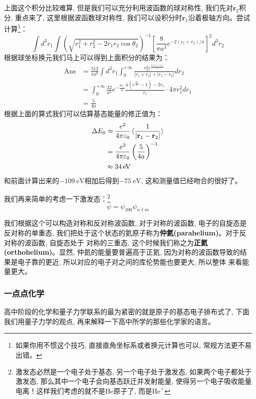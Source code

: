 上面这个积分比较难算, 但是我们可以充分利用波函数的球对称性, 我们先对$\mathbf{r}_2$积分, 重点来了, 这里根据波函数球对称性, 我们可以设积分时$\mathbf{r}_1$沿着极轴方向。尝试计算\footnote{如果你用不惯这个技巧, 直接直角坐标系或者换元计算也可以, 常规方法更不易出错。}：
\begin{equation}
    \int d^3r_1 \int \left(\sqrt{r_{1}^{2}+r_{2}^{2}-2 r_{1} r_{2} \cos \theta_{2}}\right)^{-1}\left[\frac{8}{\pi a^{3}} e^{-2\left(r_{1}+r_{2}\right) / a}\right]^2d^3r_2
\end{equation}
根据球坐标换元我们马上可以得到上面积分的结果为：
\begin{align*}
    \mathrm{Ans}&=\frac{512}{\pi a^6}\int d^3r_1\int_0^{+\infty}\frac{r_2^2 e^{\frac{4(r_1+r_2)}{a}}}{|r_1+r_2|+|r_1-r_2|}dr_2\\
    &=\int_0^{+\infty}\frac{32}{a^4}e^{-\frac{8r_1}{a}}\frac{a(e^{\frac{4r_1}{a}}-1)-2r_1}{r_1}\cdot 4\pi r_1^2dr_1\\
    &=\boxed{\frac{5}{4a}}
\end{align*}
根据上面的算式我们可以估算基态能量的修正值为：
\begin{align*}
    \Delta E_0&\approx\frac{e^2}{4\pi\varepsilon_0}\braket{\frac{1}{\left|\mathbf{r}_1-\mathbf{r}_2\right|}}\\&=\frac{e^2}{4\pi\varepsilon_0}\left(\frac{5}{4a}\right)^{-1}\\
    &\approx\SI{34}{\eV}
\end{align*}
和前面计算出来的$\SI{-109}{\eV}$相加后得到$\SI{-75}{\eV}$, 这和测量值已经吻合的很好了。

我们再来简单的考虑一下激发态：\footnote{激发态必然是一个电子处于基态, 另一个电子处于激发态, 如果两个电子都处于激发态, 那么其中一个电子会向基态跃迁并发射能量, 使得另一个电子吸收能量电离！这样我们考虑的就不是$\mathrm{He}$原子了, 而是$\mathrm{He}^+$}
\[\psi=\psi_{100}\psi_{n\ell m}\]

我们根据这个可以构造对称和反对称波函数, 对于对称的波函数, 电子的自旋态是反对称的单重态, 我们把处于这个状态的氦原子称为\textbf{仲氦(parahelium)}。对于反对称的波函数, 自旋态处于
对称的三重态, 这个时候我们称之为\textbf{正氦(orthohelium)}。显然, 仲氦的能量要普遍高于正氦, 因为对称的波函数导致的结果是电子靠的更近, 所以对应的电子对之间的库伦势能也要更大, 所以整体
来看能量更大。

\subsubsection*{一点点化学}
高中阶段的化学和量子力学联系的最为紧密的就是原子的基态电子排布式了, 下面我们用量子力学的观点, 再来解释一下高中所学的那些化学家的语言。

